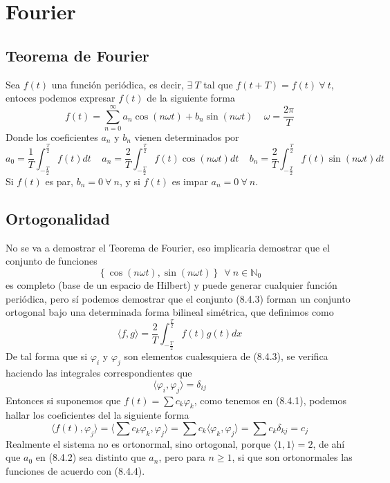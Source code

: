 \section{Fourier}
\subsection{Teorema de Fourier}
Sea $f(t)$ una función periódica, es decir, $\exists \ T$ tal que $f(t+T) = f(t) \ \forall \ t$, entoces podemos expresar $f(t)$ de la siguiente forma
\begin{equation} \label{6.1.1}
    f(t) = \sum_{n=0}^\infty a_n \cos (n\omega t) + b_n \sin (n\omega t) \ \ \ \ \ \omega = \frac{2\pi}{T}
\end{equation}
Donde los coeficientes $a_n$ y $b_n$ vienen determinados por 
\begin{equation} \label{6.1.1}
    a_0 = \frac{1}{T}\int_{-\frac{T}{2}}^{\frac{T}{2}} f(t)dt \ \ \ \ \ a_n = \frac{2}{T}\int_{-\frac{T}{2}}^{\frac{T}{2}} f(t)\cos(n\omega t)dt \ \ \ \ \ b_n = \frac{2}{T}\int_{-\frac{T}{2}}^{\frac{T}{2}} f(t)\sin(n\omega t)dt
\end{equation}
Si $f(t)$ es par, $b_n =0 \ \forall \ n$, y si $f(t)$ es impar $a_n =0 \ \forall \ n$.
\subsection{Ortogonalidad}
No se va a demostrar el Teorema de Fourier, eso implicaria demostrar que el conjunto de funciones
\begin{equation} \label{6.1.1}
    \left\{\cos(n\omega t),\sin(n\omega t)\right\} \ \ \forall \ n \in \mathbb{N}_0
\end{equation}
es completo (base de un espacio de Hilbert) y puede generar cualquier función periódica, pero sí podemos demostrar que el conjunto (8.4.3) forman un conjunto ortogonal bajo una determinada forma bilineal simétrica, que definimos como
\begin{equation} \label{6.1.1}
    \langle f,g \rangle = \frac{2}{T}\int_{-\frac{T}{2}}^{\frac{T}{2}} f(t) g(t) dx
\end{equation}
De tal forma que si $\varphi_i$ y $\varphi_j$ son elementos cualesquiera de (8.4.3), se verifica haciendo las integrales correspondientes que 
\begin{equation} \label{6.1.1}
    \langle \varphi_i, \varphi_j \rangle = \delta_{ij}
\end{equation}
Entonces si suponemos que $f(t) = \sum c_k \varphi_k$, como tenemos en (8.4.1), podemos hallar los coeficientes del la siguiente forma
\begin{equation} \label{6.1.1}
    \langle f(t), \varphi_j \rangle =\langle \sum c_k \varphi_k, \varphi_j \rangle =  \sum c_k \langle \varphi_k, \varphi_j \rangle= \sum c_k \delta_{kj} = c_j
\end{equation}
Realmente el sistema no es ortonormal, sino ortogonal, porque $\langle 1,1\rangle = 2$, de ahí que $a_0$ en (8.4.2) sea distinto que $a_n$, pero para $n\geq 1$, si que son ortonormales las funciones de acuerdo con (8.4.4).
